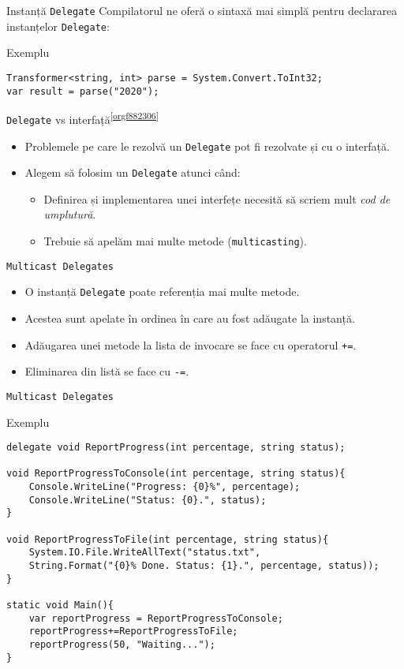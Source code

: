 \documentclass[presentation]{beamer}
\begin{document}
\begin{frame}[label={sec:org1378b4b},fragile]{Instanță \texttt{Delegate}}
 Compilatorul ne oferă o sintaxă mai simplă pentru declararea instanțelor \texttt{Delegate}:
\begin{block}{Exemplu}
\begin{verbatim}
Transformer<string, int> parse = System.Convert.ToInt32;
var result = parse("2020");
\end{verbatim}
\end{block}
\end{frame}
\begin{frame}[label={sec:org319c284},fragile]{\texttt{Delegate} vs interfață\textsuperscript{\ref{orgf882306}}}
 \begin{itemize}
\item Problemele pe care le rezolvă un \texttt{Delegate} pot fi rezolvate și cu o interfață.
\item Alegem să folosim un \texttt{Delegate} atunci când:
\begin{itemize}
\item Definirea și implementarea unei interfețe necesită să scriem mult \emph{cod de umplutură}.
\item Trebuie să apelăm mai multe metode (\texttt{multicasting}).
\end{itemize}
\end{itemize}
\end{frame}
\begin{frame}[label={sec:org88e04d4},fragile]{\texttt{Multicast Delegates}}
 \begin{itemize}
\item O instanță \texttt{Delegate} poate referenția mai multe metode.
\item Acestea sunt apelate în ordinea în care au fost adăugate la instanță.
\item Adăugarea unei metode la lista de invocare se face cu operatorul \texttt{+=}.
\item Eliminarea din listă se face cu \texttt{-=}.
\end{itemize}
\end{frame}
\begin{frame}[label={sec:orgf083cff},fragile]{\texttt{Multicast Delegates}}
 \begin{block}{Exemplu}
\begin{verbatim}
delegate void ReportProgress(int percentage, string status);

void ReportProgressToConsole(int percentage, string status){
    Console.WriteLine("Progress: {0}%", percentage);
    Console.WriteLine("Status: {0}.", status);
}

void ReportProgressToFile(int percentage, string status){
    System.IO.File.WriteAllText("status.txt",
	String.Format("{0}% Done. Status: {1}.", percentage, status));
}

static void Main(){
    var reportProgress = ReportProgressToConsole;
    reportProgress+=ReportProgressToFile;
    reportProgress(50, "Waiting...");
}
\end{verbatim}
\end{block}
\end{frame}
\end{document}
